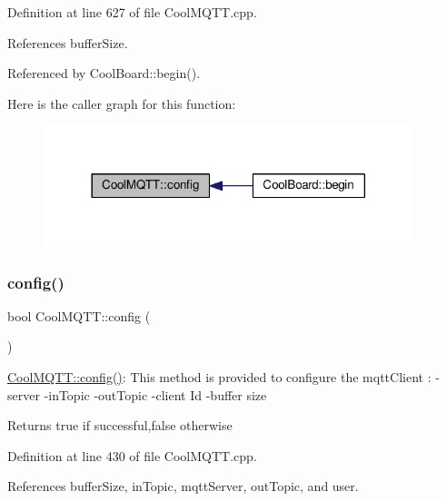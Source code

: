 Definition at line 627 of file Cool\+M\+Q\+T\+T.\+cpp.



References buffer\+Size.



Referenced by Cool\+Board\+::begin().

Here is the caller graph for this function\+:\nopagebreak
\begin{figure}[H]
\begin{center}
\leavevmode
\includegraphics[width=305pt]{d0/dd0/class_cool_m_q_t_t_a9b703de4f1358f0ee7a5e8c44979c648_icgraph}
\end{center}
\end{figure}
\mbox{\label{class_cool_m_q_t_t_a6571671781a505feca9a8a56e256c6bc}} 
\subsubsection{\texorpdfstring{config()}{config()}\hspace{0.1cm}{\footnotesize\ttfamily [2/2]}}
{\footnotesize\ttfamily bool Cool\+M\+Q\+T\+T\+::config (\begin{DoxyParamCaption}{ }\end{DoxyParamCaption})}

\hyperlink{class_cool_m_q_t_t_a6571671781a505feca9a8a56e256c6bc}{Cool\+M\+Q\+T\+T\+::config()}\+: This method is provided to configure the mqtt\+Client \+: -\/server -\/in\+Topic -\/out\+Topic -\/client Id -\/buffer size

\begin{DoxyReturn}{Returns}
true if successful,false otherwise 
\end{DoxyReturn}


Definition at line 430 of file Cool\+M\+Q\+T\+T.\+cpp.



References buffer\+Size, in\+Topic, mqtt\+Server, out\+Topic, and user.

\mbox{\label{class_cool_m_q_t_t_a30d82ad665bfb603f46ecdbc290775df}} 
